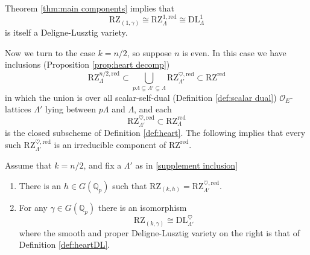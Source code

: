 \documentclass[11pt]{alggeom}
\newcommand{\iso}{\cong}
\newcommand{\red}{\mathrm{red}}
\newcommand{\Q}{\mathbb Q}
\newcommand{\co}{\mathcal O}
\begin{document}
\begin{remark}
Theorem \ref{thm:main components} implies that
\[
\mathrm{RZ}_{(1,\gamma)} \iso  \mathrm{RZ}_\Lambda^{1,\red}  \iso  \mathrm{DL}_\Lambda^1
\]
is itself a Deligne-Lusztig variety.
\end{remark}






Now we turn to the case $k=n/2$, so suppose $n$ is even.
In this case we have  inclusions (Proposition \ref{prop:heart decomp})
\begin{equation}\label{supplement inclusion}
\mathrm{RZ}_\Lambda^{n/2,\red} \subset 
 \bigcup_{ p\Lambda  \subsetneq \Lambda'  \subsetneq \Lambda}  \mathrm{RZ}_{\Lambda'}^{\heartsuit ,\red}
 \subset \mathrm{RZ}^\red
\end{equation}
 in which the union is over all scalar-self-dual (Definition \ref{def:scalar dual})   $\co_E$-lattices  $\Lambda' $ lying between $p\Lambda$ and $\Lambda$, and each 
\[
 \mathrm{RZ}_{\Lambda'}^{\heartsuit ,\red} \subset \mathrm{RZ}_\Lambda^\red
 \]
  is the  closed subscheme of Definition \ref{def:heart}.  
  The following implies that every such $\mathrm{RZ}_{\Lambda'}^{\heartsuit ,\red}$ is an irreducible component of $\mathrm{RZ}^\red$.




\begin{theorem}\label{thm:aux components}
Assume that $k=n/2$, and fix a $\Lambda'$ as in  \eqref{supplement inclusion}
\begin{enumerate}
 \item
There is an $h \in G(\Q_p)$ such that 
$\mathrm{RZ}_{( k ,h)} =  \mathrm{RZ}_{\Lambda'}^{\heartsuit ,\red} $.
\item
For any $\gamma \in G(\Q_p)$ there is an isomorphism
 \[
\mathrm{RZ}_{(k,\gamma)} \iso \mathrm{DL}_{\Lambda'}^\heartsuit
\]
where the smooth and proper Deligne-Lusztig variety on the right is that  of Definition \ref{def:heartDL}.  
\end{enumerate}
\end{theorem}
\end{document}
